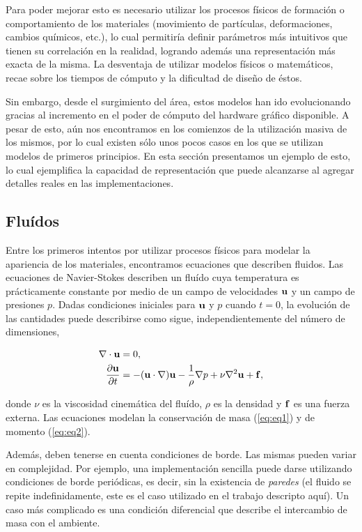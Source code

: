 Para poder mejorar esto es necesario utilizar los procesos físicos de formación o comportamiento de los materiales (movimiento de partículas, deformaciones, cambios químicos, etc.), lo cual permitiría definir parámetros más intuitivos que tienen su correlación en la realidad, logrando además una representación más exacta de la misma.
La desventaja de utilizar modelos físicos o matemáticos, recae sobre los tiempos de cómputo y la dificultad de diseño de éstos.

Sin embargo, desde el surgimiento del área, estos modelos han ido evolucionando gracias al incremento en el poder de cómputo del hardware gráfico disponible. A pesar de esto, aún nos encontramos en los comienzos de la utilización masiva de los mismos, por lo cual existen sólo unos pocos casos en los que se utilizan modelos de primeros principios.
En esta sección presentamos un ejemplo de esto, lo cual ejemplifica la capacidad de representación que puede alcanzarse al agregar detalles reales en las implementaciones.

\subsection{Fluídos}
Entre los primeros intentos por utilizar procesos físicos para modelar la apariencia de los materiales, encontramos ecuaciones que describen fluidos.
Las ecuaciones de Navier-Stokes describen un fluído cuya temperatura es prácticamente constante por medio de un campo de velocidades $\bold{u}$ y un campo de presiones $p$.
Dadas condiciones iniciales para $\bold{u}$ y $p$ cuando $t = 0$, la evolución de las cantidades puede describirse como sigue, independientemente del número de dimensiones,

\begin{align}
\nabla \cdot \bold{u} &= 0, \label{eq:eq1}\\
\frac{\partial \bold{u} }{\partial t} &= - (\bold{u} \cdot \nabla) \bold{u} - \frac{1}{\rho} \nabla p + \nu \nabla^{2} \bold{u} + \bold{f} \label{eq:eq2},
\end{align}

donde $\nu$ es la viscosidad cinemática del fluído, $\rho$ es la densidad y $\bold{f}$ es una fuerza externa.
Las ecuaciones modelan la conservación de masa (\ref{eq:eq1}) y de momento (\ref{eq:eq2}).

Además, deben tenerse en cuenta condiciones de borde.
Las mismas pueden variar en complejidad.
Por ejemplo, una implementación sencilla puede darse utilizando condiciones de borde periódicas, es decir, sin la existencia de {\em paredes} (el fluido se repite indefinidamente, este es el caso utilizado en el trabajo descripto aquí).
Un caso más complicado es una condición diferencial que describe el intercambio de masa con el ambiente.

